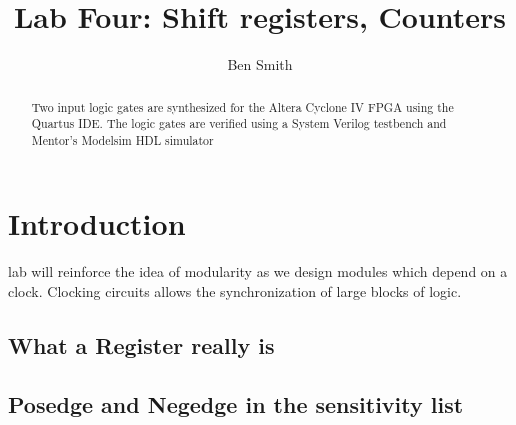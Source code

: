 
\newcommand{\TITLE}{Lab Four: Shift registers, Counters}
\newcommand{\KEYWORDS}{Logic Gates, Verilog, FPGA, Signaltap, Synthesis}
\newcommand{\ABSTRACT}{Two input logic gates are synthesized for the Altera Cyclone IV FPGA using the Quartus IDE. The logic gates are verified using a System Verilog testbench and Mentor's Modelsim HDL simulator}

\title{Lab Four: Shift registers, Counters}
\author{Ben Smith}




  \maketitle
    \begin{abstract}
      Two input logic gates are synthesized for the Altera Cyclone IV FPGA using the Quartus IDE. The logic gates are verified using a System Verilog testbench and Mentor's Modelsim HDL simulator
    \end{abstract}
\section{Introduction}
   lab will reinforce the idea of modularity as we design modules which depend on a clock. Clocking circuits allows the synchronization of large blocks of logic. 

  \subsection{What a Register really is}

  \subsection{Posedge and Negedge in the sensitivity list}

